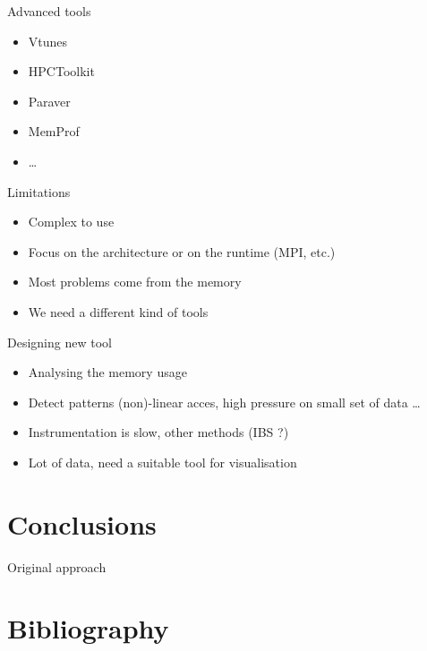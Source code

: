\documentclass[xcolor={usenames,dvipsnames}]{beamer}
\newcommand{\sectiontitle}{}
\newcommand{\newsection}[1]{\renewcommand{\sectiontitle}{#1}\section{#1}}
\newcommand{\newHsection}[1]{\renewcommand{\sectiontitle}{#1}\section*{#1}}
\begin{document}
\begin{frame}{Advanced tools}
    \begin{itemize}
        \item Vtunes \cite{Reinders05VTune}
        \item HPCToolkit \cite{Adhianto10HPCTOOLKIT}
        \item Paraver \cite{Pillet95PARAVER}
        \item MemProf \cite{Lachaize12MemProf}
        \item \dots
    \end{itemize}
    \pause
    \begin{alertblock}{Limitations}
        \begin{itemize}
            \item Complex to use
            \item Focus on the architecture or on the runtime (MPI, etc.)
            \item Most problems come from the memory
            \item We need a different kind of tools
        \end{itemize}
    \end{alertblock}
\end{frame}

\begin{frame}{Designing new tool}
    \begin{itemize}[<+->]
        \item Analysing the memory usage \cite{Beniamine13Cartographier}
        \item Detect patterns (non)-linear acces, high pressure on small set of data \dots
        \item Instrumentation is slow, other methods (IBS ?)
        \item Lot of data, need a suitable tool for visualisation \cite{Pagano13Trace,Dosimont14Trace}
    \end{itemize}
\end{frame}

\newsection{Conclusions}

\setcounter{finalframe}{\value{framenumber}}

\begin{frame}{Original approach}
\end{frame}




\newHsection{Bibliography}
%
 



\end{document}
